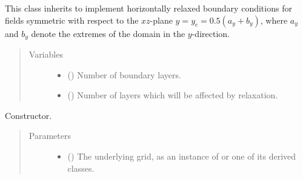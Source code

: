 \documentclass[letterpaper,10pt,english]{sphinxmanual}
\begin{document}

\begin{fulllineitems}
\label{\detokenize{api:dycore.horizontal_boundary.RelaxedSymmetricXZ}}
This class inherits {\hyperref[\detokenize{api:dycore.horizontal_boundary.Relaxed}]{}} to implement horizontally relaxed boundary conditions
for fields symmetric with respect to the \(xz\)-plane \(y = y_c = 0.5 (a_y + b_y)\),
where \(a_y\) and \(b_y\) denote the extremes of the domain in the \(y\)-direction.
\begin{quote}\begin{description}
\item[{Variables}] \leavevmode\begin{itemize}
\item {} 
{\hyperref[\detokenize{api:dycore.prognostic_isentropic.PrognosticIsentropic.nb}]{}} () \textendash{} Number of boundary layers.

\item {} 
 () \textendash{} Number of layers which will be affected by relaxation.

\end{itemize}

\end{description}\end{quote}

\begin{fulllineitems}
\label{\detokenize{api:dycore.horizontal_boundary.RelaxedSymmetricXZ.__init__}}
Constructor.
\begin{quote}\begin{description}
\item[{Parameters}] \leavevmode\begin{itemize}
\item {} 
 () \textendash{} The underlying grid, as an instance of {\hyperref[\detokenize{api:grids.grid_xyz.GridXYZ}]{}} or one of its derived classes.


\end{itemize}
\end{description}
\end{quote}
\end{fulllineitems}
\end{fulllineitems}
\end{document}
